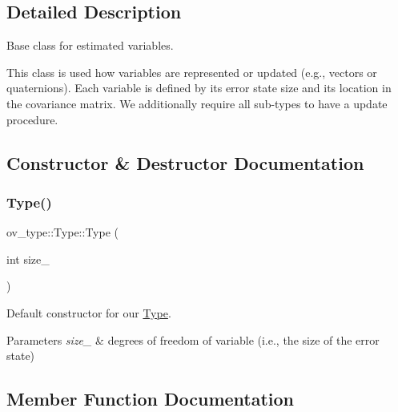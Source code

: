 \subsection{Detailed Description}
Base class for estimated variables. 

This class is used how variables are represented or updated (e.\+g., vectors or quaternions). Each variable is defined by its error state size and its location in the covariance matrix. We additionally require all sub-\/types to have a update procedure. 

\subsection{Constructor \& Destructor Documentation}
\mbox{\label{classov__type_1_1Type_a512525c192c9bd721e13eef0cb707496}} 
\subsubsection{\texorpdfstring{Type()}{Type()}}
{\footnotesize\ttfamily ov\+\_\+type\+::\+Type\+::\+Type (\begin{DoxyParamCaption}\item[{int}]{size\+\_\+ }\end{DoxyParamCaption})\hspace{0.3cm}{\ttfamily [inline]}}



Default constructor for our \hyperlink{classov__type_1_1Type}{Type}. 


\begin{DoxyParams}{Parameters}
{\em size\+\_\+} & degrees of freedom of variable (i.\+e., the size of the error state) \\
\hline
\end{DoxyParams}


\subsection{Member Function Documentation}
\mbox{\label{classov__type_1_1Type_a95fcdbc584256baffc78935de5ab5da3}} 
